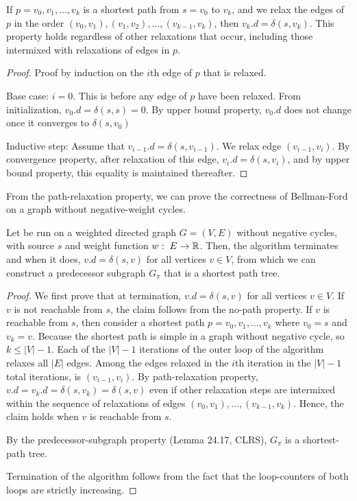 \begin{lemma}  
    If $p = v_0,v_1,\ldots,v_k$ is a shortest path from $s = v_0$ to $v_k$, and we relax the edges of $p$ in the order $(v_0,v_1),(v_1,v_2),\ldots,(v_{k-1},v_k)$, then $v_k.d = \delta(s,v_k)$. This property holds regardless of other relaxations that occur, including those intermixed with relaxations of edges in $p$.
\end{lemma}

\begin{proof}
    Proof by induction on the $i$th edge of $p$ that is relaxed.

    Base case: $i=0$. This is before any edge of $p$ have been relaxed. From initialization, $v_0.d=\delta(s,s)=0$. By upper bound property, $v_0.d$ does not change once it converges to $\delta(s,v_0)$ 
    
    Inductive step: Assume that $v_{i-1}.d = \delta(s,v_{i-1})$. We relax edge $(v_{i-1},v_i)$. By convergence property, after relaxation of this edge, $v_i.d = \delta(s,v_i)$, and by upper bound property, this equality is maintained thereafter.
\end{proof}

From the path-relaxation property, we can prove the correctness of Bellman-Ford on a graph without negative-weight cycles.

\begin{theorem}
    Let  be run on a weighted directed graph $G=(V,E)$ without negative cycles, with source $s$ and weight function $w:\; E \to \mathbb{R}$. Then, the algorithm terminates and when it does, $v.d = \delta(s,v)$ for all vertices $v \in V$, from which we can construct a predecessor subgraph $G_\pi$ that is a shortest path tree.
\end{theorem}

\begin{proof}
    We first prove that at termination, $v.d = \delta(s,v)$ for all vertices $v \in V$. If $v$ is not reachable from $s$, the claim follows from the no-path property. If $v$ is reachable from $s$, then consider a shortest path $p = v_0,v_1,\ldots,v_k$ where $v_0=s$ and $v_k = v$. Because the shortest path is simple in a graph without negative cycle, so $k \leq |V|-1$. Each of the $|V|-1$ iterations of the outer loop of the algorithm relaxes all $|E|$ edges. Among the edges relaxed in the $i$th iteration in the $|V|-1$ total iterations, is $(v_{i-1},v_i)$. By path-relaxation property, $v.d = v_k.d = \delta(s,v_k) = \delta(s,v)$ even if other relaxation steps are intermixed within the sequence of relaxations of edges $(v_0,v_1),\ldots,(v_{k-1},v_k)$. Hence, the claim holds when $v$ is reachable from $s$.

    By the predecessor-subgraph property (Lemma 24.17, CLRS), $G_\pi$ is a shortest-path tree.

    Termination of the algorithm follows from the fact that the loop-counters of both loops are strictly increasing.
\end{proof}

